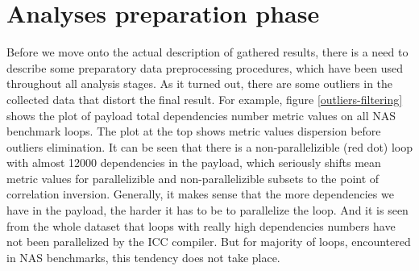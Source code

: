 \section{Analyses preparation phase}
\label{analysis-preparation-phase}
\qquad Before we move onto the actual description of gathered results, there is a need to describe some preparatory data preprocessing procedures, which have been used throughout all analysis stages.\newline
\null\qquad As it turned out, there are some outliers in the collected data that distort the final result. For example, figure \ref{outliers-filtering} shows the plot of payload total dependencies number metric values on all NAS benchmark loops. The plot at the top shows metric values dispersion before outliers elimination. It can be seen that there is a non-parallelizible (red dot) loop with almost 12000 dependencies in the payload, which seriously shifts mean metric values for parallelizible and non-parallelizible subsets to the point of correlation inversion. Generally, it makes sense that the more dependencies we have in the payload, the harder it has to be to parallelize the loop. And it is seen from the whole dataset that loops with really high dependencies numbers have not been parallelized by the ICC compiler. But for majority of loops, encountered in NAS benchmarks, this tendency does not take place. 
